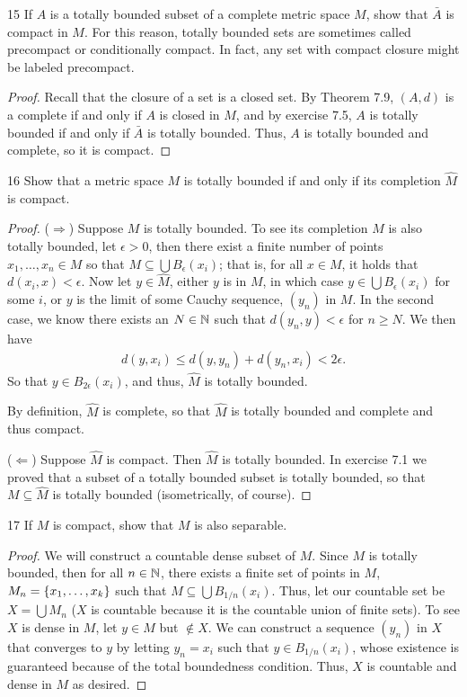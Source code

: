 \begin{exercise}{15}
If $A$ is a totally bounded subset of a complete metric space $M$, show that $\bar{A}$ is compact in $M$.
For this reason, totally bounded sets are sometimes called precompact or conditionally compact.
In fact, any set with compact closure might be labeled precompact.
\end{exercise}
\begin{proof}
Recall that the closure of a set is a closed set.
By Theorem 7.9, $(A,d)$ is a complete if and only if $A$ is closed in $M$, and by exercise 7.5, $A$ is totally bounded if and only if $\bar{A}$ is totally bounded.
Thus, $A$ is totally bounded and complete, so it is compact.
\end{proof} 

\begin{exercise}{16}
Show that a metric space $M$ is totally bounded if and only if its completion $\hat{M}$ is compact.
\end{exercise}
\begin{proof}
($\Rightarrow$)
Suppose $M$ is totally bounded.
To see its completion $\hat{M}$ is also totally bounded, let $\epsilon>0$, then there exist a finite number of points $x_1,\dots,x_n\in M$ so that $M\subseteq\bigcup B_\epsilon(x_i)$;
that is, for all $x\in M$, it holds that $d(x_i,x)<\epsilon$.
Now let $y\in \hat{M}$, either $y$ is in $M$, in which case $y\in\bigcup B_\epsilon(x_i)$ for some $i$, or $y$ is the limit of some Cauchy sequence, $(y_n)$ in $M$.
In the second case, we know there exists an $N\in\mathbb{N}$ such that $d(y_n,y)<\epsilon$ for $n\geq N$.
We then have
\begin{align*}
    d(y,x_i) \leq d(y,y_n) + d(y_n,x_i) < 2\epsilon.
\end{align*}
So that $y\in B_{2\epsilon}(x_i)$, and thus, $\hat{M}$ is totally bounded.

By definition, $\hat{M}$ is complete, so that $\hat{M}$ is totally bounded and complete and thus compact.

($\Leftarrow$)
Suppose $\hat{M}$ is compact.
Then $\hat{M}$ is totally bounded.
In exercise 7.1 we proved that a subset of a totally bounded subset is totally bounded, so that $M\subseteq\hat{M}$ is totally bounded (isometrically, of course).
\end{proof} 

\begin{exercise}{17}
If $M$ is compact, show that $M$ is also separable.
\end{exercise}
\begin{proof}
We will construct a countable dense subset of $M$.
Since $M$ is totally bounded, then for all $n\in\mathbb{N}$, there exists a finite set of points in $M$, $M_n = \{x_1, \dots, x_k\}$ such that $M \subseteq \bigcup B_{1/n}(x_i)$.
Thus, let our countable set be $X = \bigcup M_n$ ($X$ is countable because it is the countable union of finite sets).
To see $X$ is dense in $M$, let $y \in M$ but $\notin X$.
We can construct a sequence $(y_n)$ in $X$ that converges to $y$ by letting $y_n = x_i$ such that $y\in B_{1/n}(x_i)$, whose existence is guaranteed because of the total boundedness condition.
Thus, $X$ is countable and dense in $M$ as desired.
\end{proof} 

